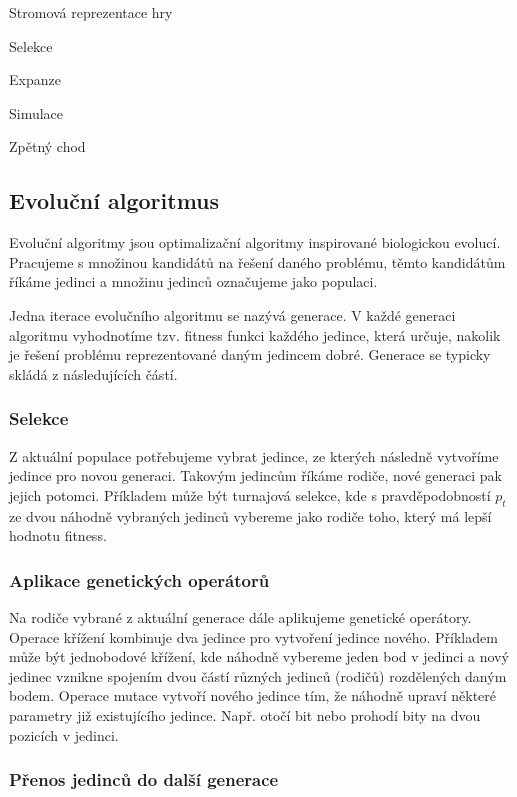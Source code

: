 Stromová reprezentace hry

Selekce

Expanze

Simulace

Zpětný chod

\subsection{Evoluční algoritmus}
 
Evoluční algoritmy jsou optimalizační algoritmy inspirované biologickou evolucí. Pracujeme s množinou kandidátů na řešení daného problému, těmto kandidátům říkáme jedinci a množinu jedinců označujeme jako populaci. 

Jedna iterace evolučního algoritmu se nazývá generace. V každé generaci algoritmu vyhodnotíme tzv. fitness funkci každého jedince, která určuje, nakolik je řešení problému reprezentované daným jedincem dobré. Generace se typicky skládá z následujících částí.

\subsubsection*{Selekce}

Z aktuální populace potřebujeme vybrat jedince, ze kterých následně vytvoříme jedince pro novou generaci. Takovým jedincům říkáme rodiče, nové generaci pak jejich potomci. Příkladem může být turnajová selekce, kde s pravděpodobností $p_t$ ze dvou náhodně vybraných jedinců vybereme jako rodiče toho,  který má lepší hodnotu fitness.

\subsubsection*{Aplikace genetických operátorů}

Na rodiče vybrané z aktuální generace dále aplikujeme genetické operátory. 
Operace křížení kombinuje dva jedince pro vytvoření jedince nového. Příkladem může být jednobodové křížení, kde náhodně vybereme jeden bod v jedinci a nový jedinec vznikne spojením dvou částí různých jedinců (rodičů) rozdělených daným bodem. 
Operace mutace vytvoří nového jedince tím, že náhodně upraví některé parametry již existujícího jedince. Např. otočí bit nebo prohodí bity na dvou pozicích v jedinci.

\subsubsection*{Přenos jedinců do další generace}


